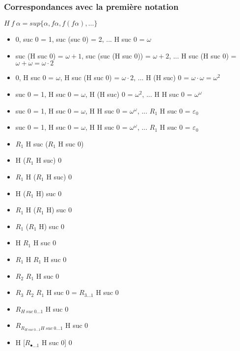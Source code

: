\documentclass[12pt]{beamer}
\begin{document}
\begin{frame}
\frametitle{Correspondances avec la première notation}

\( H\ f\ \alpha = sup \lbrace \alpha, f \alpha, f (f \alpha), \ldots \rbrace  \)

\begin{itemize}
     \setlength{\itemsep}{1pt}
     \setlength{\parskip}{0pt}
     \setlength{\parsep}{0pt}

\item 0, suc 0 = 1, suc (suc 0) = 2, ... H suc 0 = \( \omega \)
\item suc (H suc 0) = \( \omega+1 \), suc (suc (H suc 0)) = \( \omega+2 \), ... H suc (H suc 0) = \( \omega+\omega = \omega \cdot 2 \)
\item 0, H suc 0 = \( \omega \), H suc (H suc 0) = \( \omega \cdot 2 \), ... H (H suc) 0 = \( \omega \cdot \omega = \omega^2 \)
\item suc 0 = 1, H suc 0 = \( \omega \), H (H suc) 0 = \( \omega^2 \), ... H H suc 0 = \( \omega^\omega \)
\item suc 0 = 1, H suc 0 = \( \omega \), H H suc 0 = \( \omega^\omega \), ... $R_1$ H suc 0 = \( \varepsilon_0 \)

\end{itemize}

\end{frame}
\begin{frame}

\begin{itemize}
     \setlength{\itemsep}{1pt}
     \setlength{\parskip}{0pt}
     \setlength{\parsep}{0pt}

\item suc 0 = 1, H suc 0 = \( \omega \), H H suc 0 = \( \omega^\omega \), ... $R_1$ H suc 0 = \( \varepsilon_0 \)
\item $R_1$ H suc ($R_1$ H suc 0)
\item H ($R_1$ H suc) 0
\item $R_1$ H ($R_1$ H suc) 0
\item H ($R_1$ H) suc 0
\item $R_1$ H ($R_1$ H) suc 0
\item $R_1$ ($R_1$ H) suc 0
\item H $R_1$ H suc 0
\item $R_1$ H $R_1$ H suc 0
\item $R_2$ $R_1$ H suc 0 
\item $R_3$ $R_2$ $R_1$ H suc 0 = $R_{3 \ldots 1}$ H suc 0 
\item $R_{H\ suc\ 0 \ldots 1}$ H suc 0
\item $R_{R_{H\ suc\ 0 \ldots 1} H\ suc\ 0 \ldots 1}$ H suc 0
\item H [$R_{\bullet \ldots 1}$ H suc 0] 0

\end{itemize}

\end{frame}
\end{document}
